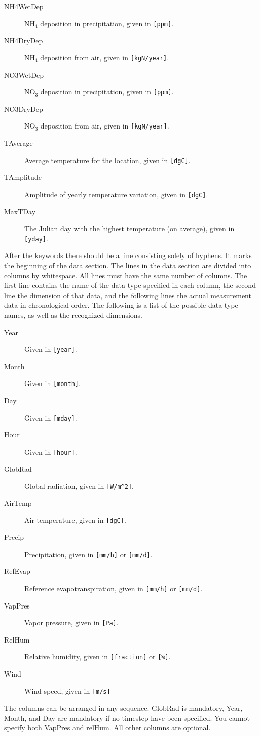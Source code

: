 \begin{description}
\item[NH4WetDep] NH$_4$ deposition in precipitation, given in
  \texttt{[ppm]}.
\item[NH4DryDep] NH$_4$ deposition from air, given in
  \texttt{[kgN/year]}. 
\item[NO3WetDep] NO$_3$ deposition in precipitation, given in
  \texttt{[ppm]}. 
\item[NO3DryDep] NO$_3$ deposition from air, given in
  \texttt{[kgN/year]}. 
\item[TAverage] Average temperature for the location, given in
  \texttt{[dgC]}. 
\item[TAmplitude] Amplitude of yearly temperature variation, given in
  \texttt{[dgC]}. 
\item[MaxTDay] The Julian day with the highest temperature (on
  average), given in \texttt{[yday]}.
\end{description}

After the keywords there should be a line consisting solely of
hyphens.  It marks the beginning of the data section.  The lines in
the data section are divided into columns by whitespace.  All lines
must have the same number of columns.  The first line contains the
name of the data type specified in each column, the second line the
dimension of that data, and the following lines the actual measurement
data in chronological order.  The following is a list of the possible
data type names, as well as the recognized dimensions.
\begin{description}
\item[Year] Given in \texttt{[year]}.
\item[Month] Given in \texttt{[month]}.
\item[Day] Given in \texttt{[mday]}.
\item[Hour] Given in \texttt{[hour]}.
\item[GlobRad] Global radiation, given in \verb|[W/m^2]|.
\item[AirTemp] Air temperature, given in \texttt{[dgC]}.
\item[Precip] Precipitation, given in \texttt{[mm/h]} or \texttt{[mm/d]}.
\item[RefEvap] Reference evapotranspiration, given in \texttt{[mm/h]}
  or \texttt{[mm/d]}.
\item[VapPres] Vapor pressure, given in \texttt{[Pa]}.
\item[RelHum] Relative humidity, given in \texttt{[fraction]} or
  \texttt{[\%]}. 
\item[Wind] Wind speed, given in \texttt{[m/s]}
\end{description}
The columns can be arranged in any sequence.  GlobRad is mandatory,
Year, Month, and Day are mandatory if no timestep have been
specified.  You cannot specify both VapPres and relHum.  All other
columns are optional. 


